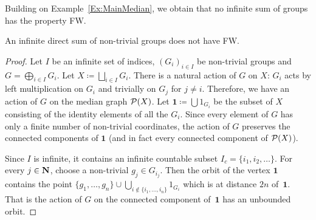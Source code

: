 Building on Example~\ref{Ex:MainMedian}, we obtain that no infinite sum of groups has the property FW.
\begin{lem}\label{Lemma:Sum}
An infinite direct sum of non-trivial groups does not have FW.
\end{lem}
\begin{proof}
Let $I$ be an infinite set of indices, $(G_i)_{i\in I}$ be non-trivial groups and $G=\bigoplus_{i\in I} G_i$.
Let $X\coloneqq\bigsqcup_{i\in I} G_i$.
There is a natural action of $G$ on $X$: $G_i$ acts by left multiplication on $G_i$ and trivially on $G_j$ for $j\neq i$.
Therefore, we have an action of $G$ on the median graph $\mathcal P(X)$.
Let $\mathbf 1\coloneqq\bigcup 1_{G_i}$ be the subset of $X$ consisting of the identity elements of all the $G_i$.
Since every element of $G$ has only a finite number of non-trivial coordinates, the action of $G$ preserves the connected components of $\mathbf 1$ (and in fact every connected component of $\mathcal P(X)$).

Since $I$ is infinite, it contains an infinite countable subset $I_c=\{i_1,i_2,\dots\}$.
For every $j\in \mathbf{N}$, choose a non-trivial $g_j\in G_{i_j}$.
Then the orbit of the vertex $\mathbf 1$ contains the point $\{g_1,\dots, g_n\}\cup\bigcup_{i\notin\{i_1,\dots,i_n\}} 1_{G_{i}}$ which is at distance $2n$ of~$\mathbf 1$.
That is the action of $G$ on the connected component of~$\mathbf 1$ has an unbounded orbit.
%
%
%
%
%
\end{proof}

